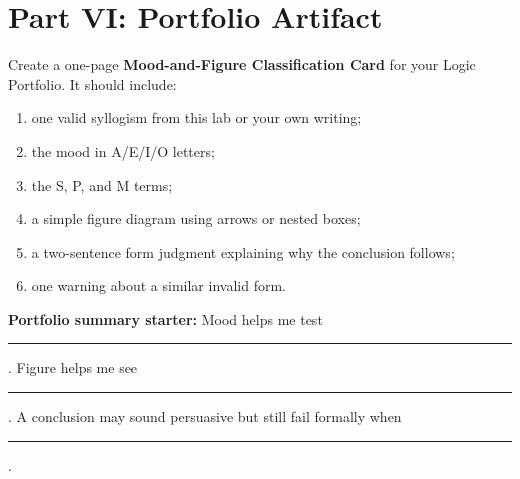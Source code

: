 \documentclass[12pt]{article}
\newcommand{\focusbox}[1]{\par\vspace{0.4em}\noindent\begingroup\setlength{\fboxsep}{6pt}\colorbox{gray!12}{\begin{minipage}{\dimexpr\linewidth-2\fboxsep\relax}#1\end{minipage}}\endgroup\par\vspace{0.5em}}
\begin{document}
\section*{Part VI: Portfolio Artifact}
Create a one-page \textbf{Mood-and-Figure Classification Card} for your Logic Portfolio. It should include:
\begin{enumerate}[leftmargin=*]
\item one valid syllogism from this lab or your own writing;
\item the mood in A/E/I/O letters;
\item the S, P, and M terms;
\item a simple figure diagram using arrows or nested boxes;
\item a two-sentence form judgment explaining why the conclusion follows;
\item one warning about a similar invalid form.
\end{enumerate}

\focusbox{\textbf{Portfolio summary starter:} Mood helps me test \rule{1.8in}{0.4pt}. Figure helps me see \rule{1.8in}{0.4pt}. A conclusion may sound persuasive but still fail formally when \rule{1.9in}{0.4pt}.}

\vspace{1.0in}
\end{document}
